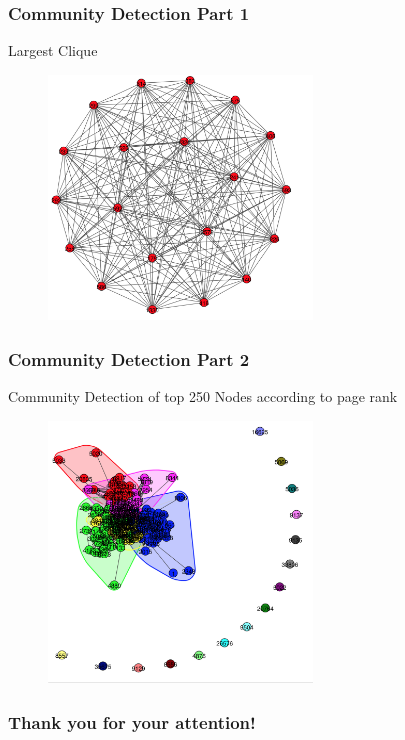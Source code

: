 \documentclass{beamer}
\begin{document}
\begin{frame}
\frametitle{Community Detection Part 1}
	\begin{center}
	 	{\tiny Largest Clique}
	\end{center}
	 \begin{figure}
		\includegraphics[width=70mm]{clique-search.png}
	\end{figure}
\end{frame}

\begin{frame}
\frametitle{Community Detection Part 2}
	\begin{center}
	 	{\tiny Community Detection of top 250 Nodes according to page rank}
	\end{center}
	 \begin{figure}
		\includegraphics[width=70mm]{communities-page-rank.png}
	\end{figure}
\end{frame}


\begin{frame}[c]
\begin{center}
\frametitle{\LARGE Thank you for your attention!}

{\LARGE \inserttitle}

\bigskip

{\insertauthor} 

\bigskip\bigskip

{\insertinstitute}

\bigskip\bigskip

{\large \insertdate}
\end{center}
\end{frame}
\end{document}

